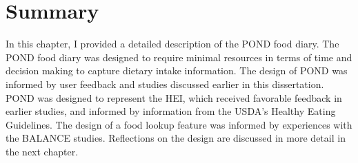 \section{Summary}

In this chapter, I provided a detailed description of the POND food diary. The POND food diary was designed to require minimal resources in terms of time and decision making to capture dietary intake information. The design of POND was informed by user feedback and studies discussed earlier in this dissertation. POND was designed to represent the HEI, which received favorable feedback in earlier studies, and informed by information from the USDA's Healthy Eating Guidelines. The design of a food lookup feature was informed by experiences with the BALANCE studies. Reflections on the design are discussed in more detail in the next chapter. 
